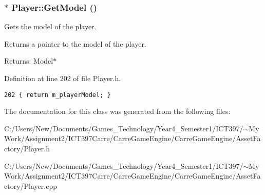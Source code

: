 \hypertarget{class_player_26741893f9eb0aeb01ead80a8bcf851f}{
\subsubsection[GetModel]{$\ast$ Player::GetModel ()}}
\label{class_player_26741893f9eb0aeb01ead80a8bcf851f}


Gets the model of the player. 

Returns a pointer to the model of the player.

\begin{Desc}
\item[Returns:]Model$\ast$ \end{Desc}


Definition at line 202 of file Player.h.

\begin{Code}\begin{verbatim}202 { return m_playerModel; }
\end{verbatim}
\end{Code}




The documentation for this class was generated from the following files:\begin{CompactItemize}
\item 
C:/Users/New/Documents/Games\_\-Technology/Year4\_\-Semester1/ICT397/$\sim$My Work/Assignment2/ICT397Carre/CarreGameEngine/CarreGameEngine/AssetFactory/Player.h\item 
C:/Users/New/Documents/Games\_\-Technology/Year4\_\-Semester1/ICT397/$\sim$My Work/Assignment2/ICT397Carre/CarreGameEngine/CarreGameEngine/AssetFactory/Player.cpp\end{CompactItemize}
